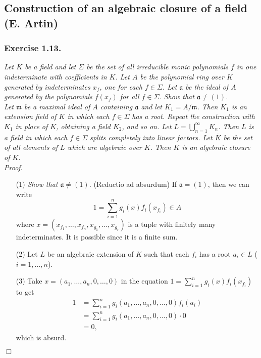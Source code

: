 \documentclass{article}
\begin{document}
\subsection*{Construction of an algebraic closure of a field (E. Artin) \\}



\subsubsection*{Exercise 1.13.}
\emph{Let $K$ be a field and let $\Sigma$
be the set of all irreducible monic polynomials $f$ in one indeterminate with coefficients in $K$.
Let $A$ be the polynomial ring over $K$ generated by indeterminates $x_f$, one for each $f \in \Sigma$.
Let $\mathfrak{a}$ be the ideal of $A$ generated by the polynomials $f(x_f)$ for all $f \in \Sigma$.
Show that $\mathfrak{a} \neq (1)$.} \\

\emph{Let $\mathfrak{m}$ be a maximal ideal of $A$ containing $\mathfrak{a}$ and
let $K_1 = A/\mathfrak{m}$.
Then $K_1$ is an extension field of $K$ in which each $f \in \Sigma$ has a root.
Repeat the construction with $K_1$ in place of $K$, obtaining a field $K_2$, and so on.
Let $L = \bigcup_{n=1}^{\infty} K_n$.
Then $L$ is a field in which each $f \in \Sigma$ splits completely into linear factors.
Let $\overline{K}$ be the set of all elements of $L$ which are algebraic over $K$.
Then $\overline{K}$ is an algebraic closure of $K$.} \\



\emph{Proof.}
\begin{enumerate}
\item[(1)]
  \emph{Show that $\mathfrak{a} \neq (1)$.}
  (Reductio ad absurdum)
  If $\mathfrak{a} = (1)$, then we can write
  \[
    1 = \sum_{i=1}^{n} g_i(x) f_i(x_{f_i}) \in A
  \]
  where $x = (x_{f_1}, \ldots, x_{f_n}, x_{g_1}, \ldots, x_{g_r})$
  is a tuple with finitely many indeterminates.
  It is possible since it is a finite sum.

\item[(2)]
  Let $L$ be an algebraic extension of $K$ such that
  each $f_i$ has a root $a_i \in L$ ($i = 1, \ldots, n$).

\item[(3)]
  Take $x = (a_1, \ldots, a_n, 0, \ldots, 0)$ in the equation $1 = \sum_{i=1}^{n} g_i(x) f_i(x_{f_i})$
  to get
  \begin{align*}
    1
    &= \sum_{i=1}^{n} g_i(a_1, \ldots, a_n, 0, \ldots, 0) f_i(a_i) \\
    &= \sum_{i=1}^{n} g_i(a_1, \ldots, a_n, 0, \ldots, 0) \cdot 0 \\
    &= 0,
  \end{align*}
  which is absurd.
\end{enumerate}
$\Box$ \\\\
\end{document}
